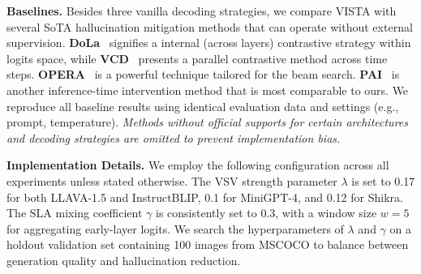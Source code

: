 \documentclass{article}
\theoremstyle{plain}
\theoremstyle{definition}
\theoremstyle{remark}
\begin{document}
\textbf{Baselines.} Besides three vanilla decoding strategies, we compare VISTA with several SoTA hallucination mitigation methods that can operate without external supervision. \textbf{DoLa}~\cite{dola} signifies a internal (across layers) contrastive strategy within logits space, while \textbf{VCD}~\cite{vcd} presents a parallel contrastive method across time steps. \textbf{OPERA}~\cite{opera} is a powerful technique tailored for the beam search. \textbf{PAI}~\cite{pai} is another inference-time intervention method that is most comparable to ours. We reproduce all baseline results using identical evaluation data and settings (e.g., prompt, temperature). \textit{{Methods without official supports for certain architectures and decoding strategies are omitted to prevent implementation bias.}}

\textbf{Implementation Details.} We employ the following configuration across all experiments unless stated otherwise. The VSV strength parameter $\lambda$ is set to 0.17 for both LLAVA-1.5 and InstructBLIP, 0.1 for MiniGPT-4, and 0.12 for Shikra. The SLA mixing coefficient $\gamma$ is consistently set to 0.3, with a window size $w=5$ for aggregating early-layer logits. We search the hyperparameters of $\lambda$ and $\gamma$ on a holdout validation set containing 100 images from MSCOCO to balance between generation quality and hallucination reduction.
\end{document}
